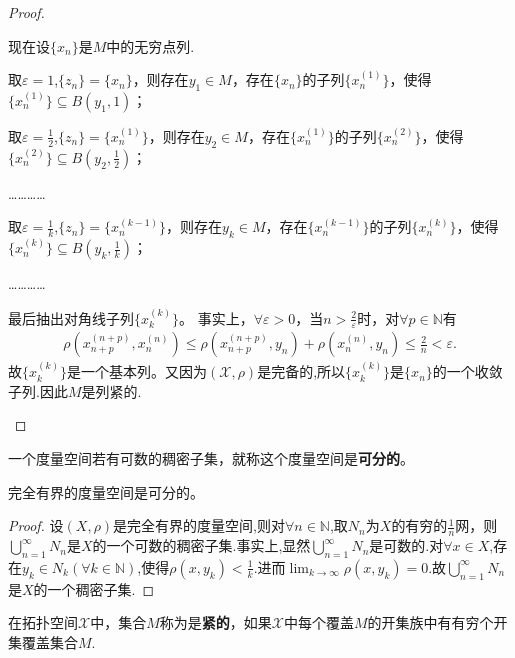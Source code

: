 \documentclass[../../main.tex]{subfiles}%
\begin{document}
\begin{proof}
\begin{enumerate}[(1)]
现在设$\{x_n\}$是$M$中的无穷点列.

取$\varepsilon =1$,$\{z_n\}=\{x_n\}$，则存在$y_1\in M$，存在$\{x_n\}$的子列$\{x_n^{(1)}\}$，使得$\{x_n^{(1)}\}\subseteq B\left( y_1,1 \right)$；

取$\varepsilon =\frac{1}{2}$,$\{z_n\}=\{x_n^{(1)}\}$，则存在$y_2\in M$，存在$\{x_n^{(1)}\}$的子列$\{x_n^{(2)}\}$，使得$\{x_n^{(2)}\}\subseteq B\left( y_2,\frac{1}{2} \right)$；

…………

取$\varepsilon =\frac{1}{k}$,$\{z_n\}=\{x_n^{(k-1)}\}$，则存在$y_k\in M$，存在$\{x_n^{(k-1)}\}$的子列$\{x_n^{(k)}\}$，使得$\{x_n^{(k)}\}\subseteq B\left( y_k,\frac{1}{k} \right)$；

…………

最后抽出对角线子列$\{x_k^{(k)}\}$。
事实上，$\forall\varepsilon>0$，当$n>\frac{2}{\varepsilon}$时，对$\forall p\in\mathbb{N}$有
\begin{align*}
\rho(x_{n+p}^{(n+p)},x_n^{(n)})\leqslant\rho(x_{n+p}^{(n+p)},y_n)+\rho(x_n^{(n)},y_n) 
\leqslant\frac{2}{n}<\varepsilon.
\end{align*}
故$\{x_k^{(k)}\}$是一个基本列。又因为$(\mathscr{X},\rho)$是完备的,所以$\{x_k^{(k)}\}$是$\{x_n\}$的一个收敛子列.因此$M$是列紧的.
\end{enumerate}
\end{proof}

\begin{definition}
一个度量空间若有可数的稠密子集，就称这个度量空间是\textbf{可分的}。
\end{definition}

\begin{theorem}
完全有界的度量空间是可分的。
\end{theorem}
\begin{proof}
设$(X,\rho)$是完全有界的度量空间,则对$\forall n\in \mathbb{N}$,取$N_n$为$X$的有穷的$\frac{1}{n}$网，则$\bigcup\limits_{n=1}^\infty N_n$是$X$的一个可数的稠密子集.事实上,显然$\bigcup\limits_{n=1}^\infty N_n$是可数的.对$\forall x\in X$,存在$y_k\in N_k(\forall k\in \mathbb{N})$,使得$\rho(x,y_k)<\frac{1}{k}$.进而$\lim_{k\to \infty}\rho(x,y_k)=0$.故$\bigcup\limits_{n=1}^\infty N_n$是$X$的一个稠密子集.
\end{proof}

\begin{definition}
在拓扑空间$\mathscr{X}$中，集合$M$称为是\textbf{紧的}，如果$\mathscr{X}$中每个覆盖$M$的开集族中有有穷个开集覆盖集合$M$.
\end{definition}
\end{document}
